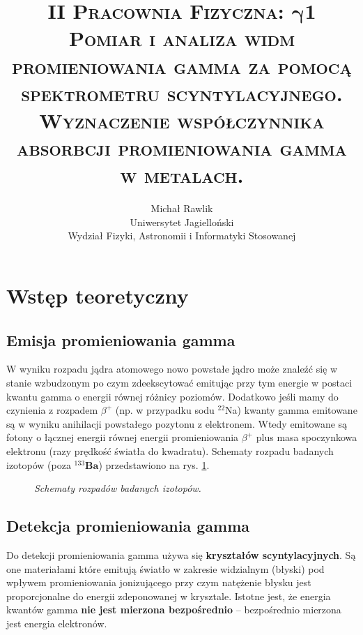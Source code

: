 \documentclass[10pt, twocolumn]{article}
\title{\textsc{II Pracownia Fizyczna: \textbf{$\mathbf{\gamma}$1}\\Pomiar i analiza widm promieniowania gamma za pomocą spektrometru scyntylacyjnego. Wyznaczenie współczynnika absorbcji promieniowania gamma w metalach.}}
\author{Michał Rawlik\\
\small Uniwersytet Jagielloński\\
\small Wydział Fizyki, Astronomii i Informatyki Stosowanej}
\begin{document}

\section*{Wstęp teoretyczny}

\subsection*{Emisja promieniowania gamma}
W wyniku rozpadu jądra atomowego nowo powstałe jądro może znaleźć się w stanie wzbudzonym po czym zdeekscytować emitując przy tym energie w postaci kwantu gamma o energii równej różnicy poziomów. Dodatkowo jeśli mamy do czynienia z rozpadem $\beta^+$ (np. w przypadku sodu $^{22}$Na) kwanty gamma emitowane są w wyniku anihilacji powstałego pozytonu z elektronem. Wtedy emitowane są fotony o łącznej energii równej energii promieniowania $\beta^+$ plus masa spoczynkowa elektronu (razy prędkość światła do kwadratu). Schematy rozpadu badanych izotopów (poza $^{133}\mathbf{Ba}$) przedstawiono na rys. \ref{schematy}.
\begin{figure}
  \caption{\em Schematy rozpadów badanych izotopów.}
  \label{schematy}
\end{figure}

\subsection*{Detekcja promieniowania gamma}
Do detekcji promieniowania gamma używa się \textbf{kryształów scyntylacyjnych}. Są one materiałami które emitują światło w zakresie widzialnym (błyski) pod wpływem promieniowania jonizującego przy czym natężenie błysku jest proporcjonalne do energii zdeponowanej w krysztale. Istotne jest, że energia kwantów gamma \textbf{nie jest mierzona bezpośrednio} -- bezpośrednio mierzona jest energia elektronów.
\end{document}
